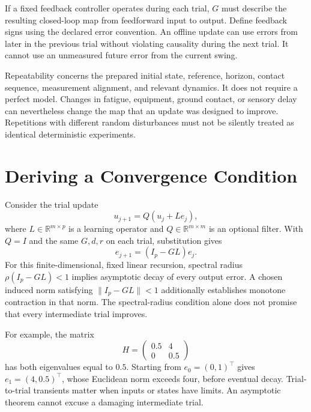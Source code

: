 \documentclass[12pt, openany]{book}
\theoremstyle{plain}
\begin{document}
If a fixed feedback controller operates during each trial, $G$ must describe the resulting closed-loop map from feedforward input to output. Define feedback signs using the declared error convention. An offline update can use errors from later in the previous trial without violating causality during the next trial. It cannot use an unmeasured future error from the current swing.

Repeatability concerns the prepared initial state, reference, horizon, contact sequence, measurement alignment, and relevant dynamics. It does not require a perfect model. Changes in fatigue, equipment, ground contact, or sensory delay can nevertheless change the map that an update was designed to improve. Repetitions with different random disturbances must not be silently treated as identical deterministic experiments.

\section{Deriving a Convergence Condition}

Consider the trial update
\begin{equation}
u_{j+1}=Q(u_j+L e_j),
\end{equation}
where $L\in\mathbb R^{m\times p}$ is a learning operator and $Q\in\mathbb R^{m\times m}$ is an optional filter. With $Q=I$ and the same $G,d,r$ on each trial, substitution gives
\begin{equation}
e_{j+1}=(I_p-GL)e_j .
\end{equation}
For this finite-dimensional, fixed linear recursion, spectral radius $\rho(I_p-GL)<1$ implies asymptotic decay of every output error. A chosen induced norm satisfying $\|I_p-GL\|<1$ additionally establishes monotone contraction in that norm. The spectral-radius condition alone does not promise that every intermediate trial improves.

For example, the matrix
\begin{equation}
H=\begin{pmatrix}0.5&4\\0&0.5\end{pmatrix}
\end{equation}
has both eigenvalues equal to $0.5$. Starting from $e_0=(0,1)^\top$ gives $e_1=(4,0.5)^\top$, whose Euclidean norm exceeds four, before eventual decay. Trial-to-trial transients matter when inputs or states have limits. An asymptotic theorem cannot excuse a damaging intermediate trial.
\end{document}

